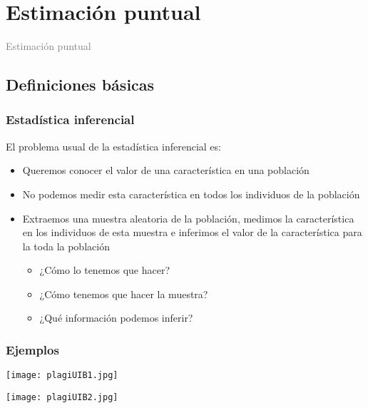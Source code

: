 \documentclass[12pt,t]{beamer}
\title[\red{Matemáticas III GINF}]{}
\author[]{}
\date{}
\newcommand{\gray}[1]{\textcolor{gray}{#1}}
\renewcommand{\emph}[1]{{\color{red}#1}}
\theoremstyle{plain}
\theoremstyle{definition}
\begin{document}

\beamertemplatedotitem

\lstset{breaklines=true}
\lstset{basicstyle=\ttfamily}


\section{Estimación puntual}

\begin{frame}
\vfill
\begin{center}
\gray{\LARGE Estimación puntual}
\end{center}
\vfill
\end{frame}






\subsection{Definiciones básicas}


\begin{frame}
\frametitle{Estadística inferencial}

El problema usual de la \emph{estadística inferencial} es:

\begin{itemize}

\item Queremos conocer el valor de una característica en una población
\medskip

\item No podemos medir esta característica en todos los individuos de la población
\medskip

\item Extraemos una muestra  aleatoria de la población,  medimos la característica en los  individuos de esta muestra e  \emph{inferimos} el valor de la característica para la toda la población

\begin{itemize}
\item ¿Cómo lo tenemos que hacer?
\item ¿Cómo tenemos que hacer la muestra?
\item ¿Qué información podemos inferir?
\end{itemize}
\end{itemize}
\end{frame}



\begin{frame}
\frametitle{Ejemplos}

\begin{center}
\hspace*{-0.5cm}
\texttt{[image: plagiUIB1.jpg]}\bigskip

\hspace*{-0.5cm}\texttt{[image: plagiUIB2.jpg]}
\end{center}
\end{frame}
\end{document}
